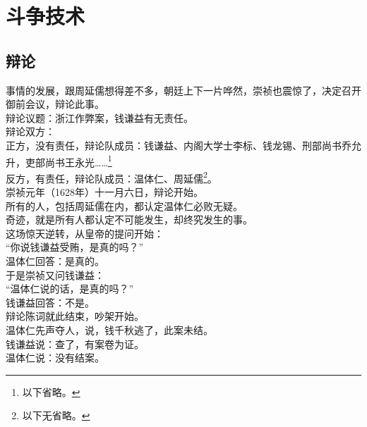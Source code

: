 \section{斗争技术}
\ifnum{}
	\begin{multicols}{\theparacolNo}
\fi
\subsection{辩论}
事情的发展，跟周延儒想得差不多，朝廷上下一片哗然，崇祯也震惊了，决定召开御前会议，辩论此事。\\

辩论议题：浙江作弊案，钱谦益有无责任。\\

辩论双方：\\

正方，没有责任，辩论队成员：钱谦益、内阁大学士李标、钱龙锡、刑部尚书乔允升，吏部尚书王永光……\footnote{以下省略。}\\

反方，有责任，辩论队成员：温体仁、周延儒\footnote{以下无省略。}。\\

崇祯元年（1628年）十一月六日，辩论开始。\\

所有的人，包括周延儒在内，都认定温体仁必败无疑。\\

奇迹，就是所有人都认定不可能发生，却终究发生的事。\\

这场惊天逆转，从皇帝的提问开始：\\

“你说钱谦益受贿，是真的吗？”\\

温体仁回答：是真的。\\

于是崇祯又问钱谦益：\\

“温体仁说的话，是真的吗？”\\

钱谦益回答：不是。\\

辩论陈词就此结束，吵架开始。\\

温体仁先声夺人，说，钱千秋逃了，此案未结。\\

钱谦益说：查了，有案卷为证。\\

温体仁说：没有结案。\\


\end{multicols}

